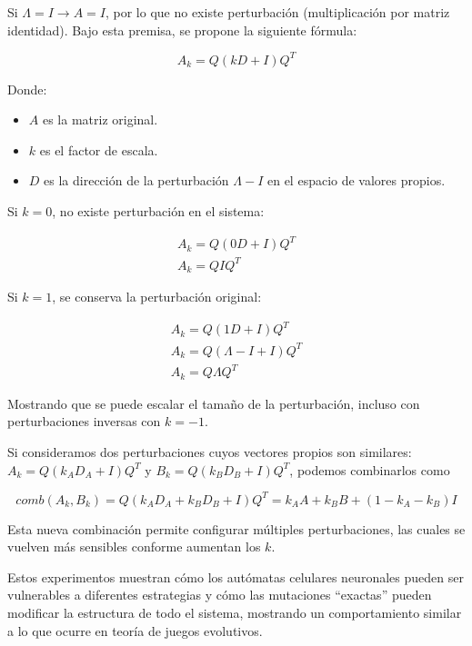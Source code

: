 Si $\Lambda = I \to A = I$, por lo que no existe perturbación (multiplicación por matriz identidad). Bajo esta premisa, se propone la siguiente fórmula:

\[ A_k = Q(kD + I)Q^T\]

Donde:

\begin{itemize}
	
	\item $A$ es la matriz original.
	
	\item $k$ es el factor de escala.
	
	\item $D$ es la dirección de la perturbación $\Lambda - I$ en el espacio de valores propios. 
	
\end{itemize}

Si $k = 0$, no existe perturbación en el sistema:

\begin{gather*}
	A_k = Q(0D + I)Q^T \\
	A_k = Q I Q^T
\end{gather*}

Si $k = 1$, se conserva la perturbación original:

\begin{gather*}
	A_k = Q(1D + I)Q^T \\
	A_k = Q(\Lambda - I + I)Q^T \\
	A_k = Q \Lambda Q^T
\end{gather*}

Mostrando que se puede escalar el tamaño de la perturbación, incluso con perturbaciones inversas con $k = -1$.

Si consideramos dos perturbaciones cuyos vectores propios son similares: $A_k = Q(k_AD_A + I)Q^T$ y $B_k = Q(k_B D_B + I)Q^T$, podemos combinarlos como

\[ comb(A_k, B_k) = Q (k_A D_A + k_B D_B + I) Q^T = k_A A + k_B B + (1 - k_A - k_B) I \]

Esta nueva combinación permite configurar múltiples perturbaciones, las cuales se vuelven más sensibles conforme aumentan los $k$.

Estos experimentos muestran cómo los autómatas celulares neuronales pueden ser vulnerables a diferentes estrategias y cómo las mutaciones ``exactas'' pueden modificar la estructura de todo el sistema, mostrando un comportamiento similar a lo que ocurre en teoría de juegos evolutivos.

